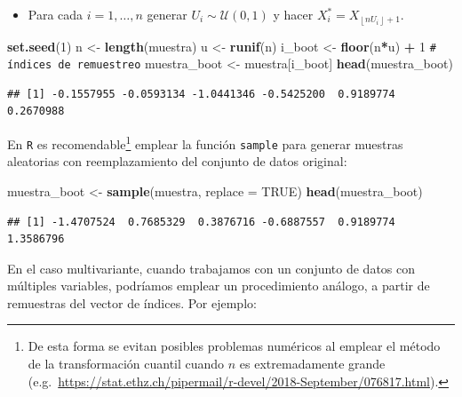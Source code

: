 \documentclass[
]{book}
\newenvironment{Shaded}{\begin{snugshade}}{\end{snugshade}}
\newcommand{\AttributeTok}[1]{\textcolor[rgb]{0.13,0.29,0.53}{#1}}
\newcommand{\CommentTok}[1]{\textcolor[rgb]{0.56,0.35,0.01}{\textit{#1}}}
\newcommand{\ConstantTok}[1]{\textcolor[rgb]{0.56,0.35,0.01}{#1}}
\newcommand{\DecValTok}[1]{\textcolor[rgb]{0.00,0.00,0.81}{#1}}
\newcommand{\FunctionTok}[1]{\textcolor[rgb]{0.13,0.29,0.53}{\textbf{#1}}}
\newcommand{\NormalTok}[1]{#1}
\newcommand{\OtherTok}[1]{\textcolor[rgb]{0.56,0.35,0.01}{#1}}
\newcommand{\SpecialCharTok}[1]{\textcolor[rgb]{0.81,0.36,0.00}{\textbf{#1}}}
\providecommand{\tightlist}{%
  \setlength{\itemsep}{0pt}\setlength{\parskip}{0pt}}
\theoremstyle{break}
\theoremstyle{nonumberplain}
\renewcommand{\CommentTok}[1]{\textcolor[rgb]{0.41,0.41,0.41}{\texttt{#1}}}
\let\oldfootnote\footnote
\renewcommand\footnote[1]{\oldfootnote{\hspace{2mm}#1}}
\begin{document}
\begin{itemize}
\tightlist
\item
  Para cada \(i=1,\ldots ,n\)
  generar \(U_i\sim \mathcal{U}\left( 0,1 \right)\) y
  hacer \(X_i^{\ast}=X_{\left\lfloor nU_i\right\rfloor +1}\).
\end{itemize}

\begin{Shaded}
\begin{Highlighting}[]
\FunctionTok{set.seed}\NormalTok{(}\DecValTok{1}\NormalTok{)}
\NormalTok{n }\OtherTok{\textless{}{-}} \FunctionTok{length}\NormalTok{(muestra)}
\NormalTok{u }\OtherTok{\textless{}{-}} \FunctionTok{runif}\NormalTok{(n)}
\NormalTok{i\_boot }\OtherTok{\textless{}{-}} \FunctionTok{floor}\NormalTok{(n}\SpecialCharTok{*}\NormalTok{u) }\SpecialCharTok{+} \DecValTok{1} \CommentTok{\# índices de remuestreo}
\NormalTok{muestra\_boot }\OtherTok{\textless{}{-}}\NormalTok{ muestra[i\_boot]}
\FunctionTok{head}\NormalTok{(muestra\_boot)}
\end{Highlighting}
\end{Shaded}

\begin{verbatim}
## [1] -0.1557955 -0.0593134 -1.0441346 -0.5425200  0.9189774  0.2670988
\end{verbatim}

En \texttt{R} es recomendable\footnote{De esta forma se evitan posibles problemas numéricos
  al emplear el método de la transformación cuantil cuando \(n\) es extremadamente grande
  (e.g.~\url{https://stat.ethz.ch/pipermail/r-devel/2018-September/076817.html}).}
emplear la función \texttt{sample} para generar muestras aleatorias con reemplazamiento
del conjunto de datos original:

\begin{Shaded}
\begin{Highlighting}[]
\NormalTok{muestra\_boot }\OtherTok{\textless{}{-}} \FunctionTok{sample}\NormalTok{(muestra, }\AttributeTok{replace =} \ConstantTok{TRUE}\NormalTok{)}
\FunctionTok{head}\NormalTok{(muestra\_boot)}
\end{Highlighting}
\end{Shaded}

\begin{verbatim}
## [1] -1.4707524  0.7685329  0.3876716 -0.6887557  0.9189774  1.3586796
\end{verbatim}

En el caso multivariante, cuando trabajamos con un conjunto de datos
con múltiples variables,
podríamos emplear un procedimiento análogo, a partir de remuestras del
vector de índices. Por ejemplo:
\end{document}
